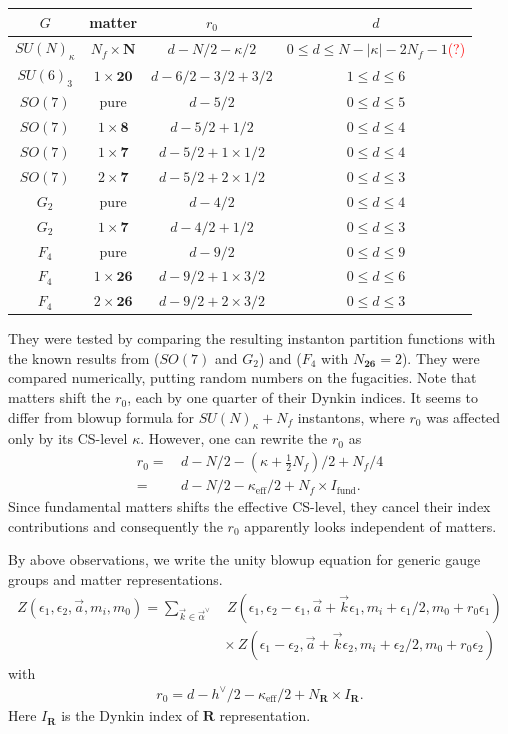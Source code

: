 \documentclass[letterpaper, 11pt]{article}
\begin{document}
\begin{tabular}{|c|c|c|c|}
\hline
$G$ & matter & $r_0$ & $d$\\
\hline
$SU(N)_\kappa$ & $N_f\times\boldsymbol{N}$ & $d-N/2-\kappa/2$ & $0\leq d \leq N-|\kappa|-2N_f-1$\textcolor{red}{(?)}\\
\hline
$SU(6)_{3}$ & $1\times\boldsymbol{20}$ & $d-6/2-3/2+3/2$ & $1\leq d\leq 6$\\
\hline
$SO(7)$ & pure & $d-5/2$ & $0\leq d \leq 5$\\
\hline
$SO(7)$ & $1\times\textbf{8}$ & $d-5/2+1/2$ & $0\leq d\leq 4$\\
\hline
$SO(7)$ & $1\times\textbf{7}$ & $d-5/2+1\times1/2$ & $0\leq d\leq 4$\\
\hline
$SO(7)$ & $2\times\textbf{7}$ & $d-5/2+2\times1/2$ & $0\leq d\leq 3$\\
\hline
$G_2$ & pure & $d-4/2$ & $0\leq d \leq 4$\\
\hline
$G_2$ & $1\times\textbf{7}$ & $d-4/2+1/2$ & $0\leq d\leq 3$\\
\hline
$F_4$ & pure & $d-9/2$ & $0\leq d \leq 9$\\
\hline
$F_4$ & $1\times\textbf{26}$ & $d-9/2+1\times 3/2$ & $0\leq d\leq 6$\\
\hline
$F_4$ & $2\times\textbf{26}$ & $d-9/2+2\times 3/2$ & $0\leq d\leq 3$\\
\hline
\end{tabular}


They were tested by comparing the resulting instanton partition functions with the known results from \cite{Kim:2018gjo}($SO(7)$ and $G_2$) and \cite{DelZotto:2018tcj}($F_4$ with $N_{\boldsymbol{26}}=2$). They were compared numerically, putting random numbers on the fugacities.
Note that matters shift the $r_0$, each by one quarter of their Dynkin indices. It seems to differ from blowup formula for $SU(N)_\kappa+N_f$ instantons, where $r_0$ was affected only by its CS-level $\kappa$. However, one can rewrite the $r_0$ as
\begin{align}
r_0=&\,d-N/2-\left(\kappa+\frac{1}{2}N_f\right)/2+N_f/4\nonumber\\
=&\,d-N/2-\kappa_{\textrm{eff}}/2+N_f\times I_{\textrm{fund}}.
\end{align}
Since fundamental matters shifts the effective CS-level, they cancel their index contributions and consequently the $r_0$ apparently looks independent of matters. 

By above observations, we write the unity blowup equation for generic gauge groups and matter representations.
\begin{align}
Z(\epsilon_1,\epsilon_2,\vec{a},m_i,m_0)=\sum_{\vec{k}\in\vec{\alpha}^{\lor}}&\,Z(\epsilon_1,\epsilon_2-\epsilon_1,\vec{a}+\vec{k}\epsilon_1,m_i+\epsilon_1/2,m_0+r_0\epsilon_1)\nonumber\\
&\times\,Z(\epsilon_1-\epsilon_2,\vec{a}+\vec{k}\epsilon_2,m_i+\epsilon_2/2,m_0+r_0\epsilon_2)
\end{align}
with 
\begin{align}
r_0=d-h^{\lor}/2-\kappa_{\textrm{eff}}/2+N_{\boldsymbol{R}}\times I_{\boldsymbol{R}}.
\end{align}
Here $I_{\boldsymbol{R}}$ is the Dynkin index of $\boldsymbol{R}$ representation.
\end{document}
